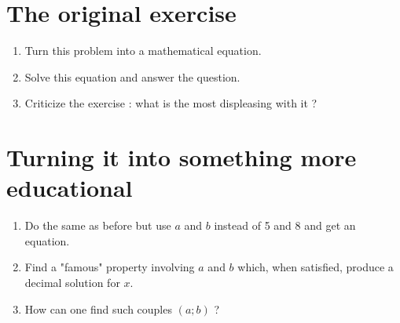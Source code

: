 \documentclass[12pt,a4paper,article,english,firamath]{nsi}
\begin{document}
\maketitle

\section*{The original exercise}

\begin{enumerate}
    \item Turn this problem into a mathematical equation.
    \item Solve this equation and answer the question.
    \item Criticize the exercise : what is the most displeasing with it ?
\end{enumerate}
\section*{Turning it into something more educational}


\begin{enumerate}
    \item Do the same as before but use $a$ and $b$ instead of 5 and 8 and get an equation.
    \item Find a "famous" property involving $a$ and $b$  which, when satisfied, produce a decimal solution for $x$.
    \item How can one find such couples $(a;b)$ ? 
\end{enumerate}
\end{document}
